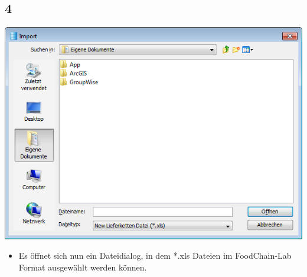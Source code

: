 \documentclass{beamer}
\begin{document}
\subsection{4}
\begin{frame}
	\begin{center}
  		\includegraphics[height=0.6\textheight]{4.png}
	\end{center}
	\begin{itemize}
		\item Es öffnet sich nun ein Dateidialog, in dem *.xls Dateien im FoodChain-Lab Format ausgewählt werden können.
	\end{itemize}
\end{frame}
\end{document}
